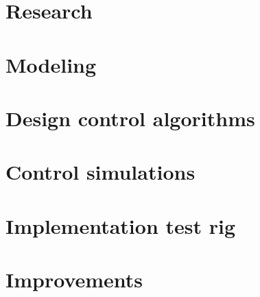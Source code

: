 
\section{Research}

\section{Modeling}

\section{Design control algorithms}

\section{Control simulations}

\section{Implementation test rig}

\section{Improvements}

